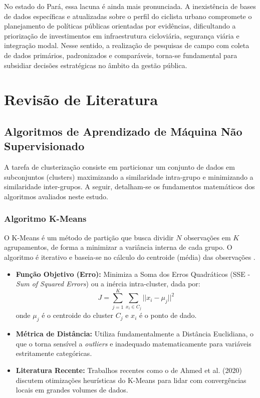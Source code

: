 \documentclass[12pt]{article}
\begin{document}
No estado do Pará, essa lacuna é ainda mais pronunciada. A inexistência de bases de dados específicas e atualizadas sobre o perfil do ciclista urbano compromete o planejamento de políticas públicas orientadas por evidências, dificultando a priorização de investimentos em infraestrutura cicloviária, segurança viária e integração modal. Nesse sentido, a realização de pesquisas de campo com coleta de dados primários, padronizados e comparáveis, torna-se fundamental para subsidiar decisões estratégicas no âmbito da gestão pública.

\section{Revisão de Literatura}
\subsection{Algoritmos de Aprendizado de Máquina Não Supervisionado}

A tarefa de clusterização consiste em particionar um conjunto de dados em subconjuntos (clusters) maximizando a similaridade intra-grupo e minimizando a similaridade inter-grupos. A seguir, detalham-se os fundamentos matemáticos dos algoritmos avaliados neste estudo.

\subsubsection{Algoritmo K-Means}
O K-Means é um método de partição que busca dividir $N$ observações em $K$ agrupamentos, de forma a minimizar a variância interna de cada grupo. O algoritmo é iterativo e baseia-se no cálculo do centroide (média) das observações \cite{sinaga2020unsupervised}.
\begin{itemize}
    \item \textbf{Função Objetivo (Erro):} Minimiza a Soma dos Erros Quadráticos (SSE - \textit{Sum of Squared Errors}) ou a inércia intra-cluster, dada por:
    $$ J = \sum_{j=1}^{K} \sum_{x_i \in C_j} ||x_i - \mu_j||^2 $$
    onde $\mu_j$ é o centroide do cluster $C_j$ e $x_i$ é o ponto de dado.
    \item \textbf{Métrica de Distância:} Utiliza fundamentalmente a Distância Euclidiana, o que o torna sensível a \textit{outliers} e inadequado matematicamente para variáveis estritamente categóricas.
    \item \textbf{Literatura Recente:} Trabalhos recentes como o de Ahmed et al. (2020) \cite{ahmed2020k} discutem otimizações heurísticas do K-Means para lidar com convergências locais em grandes volumes de dados.
\end{itemize}
\end{document}
